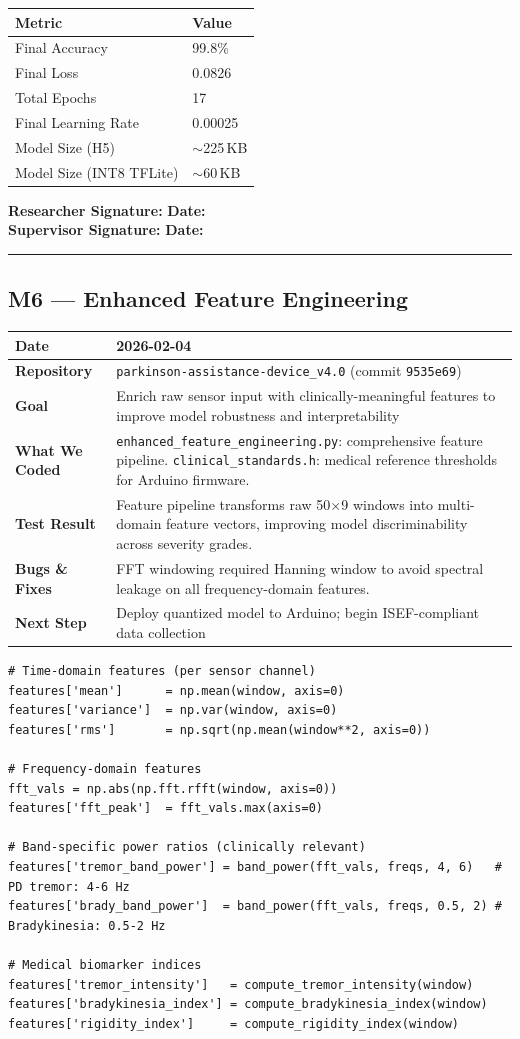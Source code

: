 \documentclass[12pt,a4paper]{article}
\makeatletter
\newcommand{\sigblock}{%
  \vspace{0.6em}
  \noindent\textbf{Researcher Signature:} \underline{\hspace{6cm}} \quad \textbf{Date:} \underline{\hspace{3cm}}\\[0.4em]
  \noindent\textbf{Supervisor Signature:} \underline{\hspace{6cm}} \quad \textbf{Date:} \underline{\hspace{3cm}}
  \vspace{0.4em}\hrule\vspace{0.6em}
}
\newenvironment{milestonetable}{%
  \begin{tcolorbox}[colback=codebg, colframe=codeframe, breakable, left=4pt, right=4pt, top=4pt, bottom=4pt]
  \begin{tabularx}{\linewidth}{@{}>{\bfseries}p{3.2cm} X@{}}
  \toprule
}{%
  \bottomrule
  \end{tabularx}
  \end{tcolorbox}
}
\newcommand{\mrow}[2]{\midrule #1 & #2 \\}
\makeatother
\begin{document}
\begin{center}
\begin{tabular}{@{}ll@{}}
\toprule
\textbf{Metric} & \textbf{Value} \\
\midrule
Final Accuracy      & 99.8\% \\
Final Loss          & 0.0826 \\
Total Epochs        & 17 \\
Final Learning Rate & 0.00025 \\
Model Size (H5)     & $\sim$225\,KB \\
Model Size (INT8 TFLite) & $\sim$60\,KB \\
\bottomrule
\end{tabular}
\end{center}

\sigblock

\subsection{M6 --- Enhanced Feature Engineering}

\begin{milestonetable}
\mrow{Date}{2026-02-04}
\mrow{Repository}{\texttt{parkinson-assistance-device\_v4.0} (commit \texttt{9535e69})}
\mrow{Goal}{Enrich raw sensor input with clinically-meaningful features to improve model robustness and interpretability}
\mrow{What We Coded}{\texttt{enhanced\_feature\_engineering.py}: comprehensive feature pipeline. \texttt{clinical\_standards.h}: medical reference thresholds for Arduino firmware.}
\mrow{Test Result}{Feature pipeline transforms raw 50$\times$9 windows into multi-domain feature vectors, improving model discriminability across severity grades.}
\mrow{Bugs \& Fixes}{FFT windowing required Hanning window to avoid spectral leakage on all frequency-domain features.}
\mrow{Next Step}{Deploy quantized model to Arduino; begin ISEF-compliant data collection}
\end{milestonetable}

\begin{lstlisting}[style=pythonstyle, caption={enhanced\_feature\_engineering.py -- Feature categories}]
# Time-domain features (per sensor channel)
features['mean']      = np.mean(window, axis=0)
features['variance']  = np.var(window, axis=0)
features['rms']       = np.sqrt(np.mean(window**2, axis=0))

# Frequency-domain features
fft_vals = np.abs(np.fft.rfft(window, axis=0))
features['fft_peak']  = fft_vals.max(axis=0)

# Band-specific power ratios (clinically relevant)
features['tremor_band_power'] = band_power(fft_vals, freqs, 4, 6)   # PD tremor: 4-6 Hz
features['brady_band_power']  = band_power(fft_vals, freqs, 0.5, 2) # Bradykinesia: 0.5-2 Hz

# Medical biomarker indices
features['tremor_intensity']   = compute_tremor_intensity(window)
features['bradykinesia_index'] = compute_bradykinesia_index(window)
features['rigidity_index']     = compute_rigidity_index(window)
\end{lstlisting}
\end{document}
